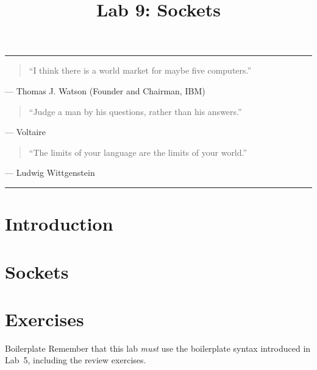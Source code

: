 \documentclass[11pt]{cselabheader}
\title{Lab 9: Sockets}
\begin{document}
\maketitle

\hrule
\begin{quotation}
``I think there is a world market for maybe five computers.''
\end{quotation}
\begin{flushright}
--- Thomas J. Watson (Founder and Chairman, IBM)
\end{flushright}

\begin{quotation}
``Judge a man by his questions, rather than his answers.''
\end{quotation}
\begin{flushright}
--- Voltaire
\end{flushright}

\begin{quotation}
``The limits of your language are the limits of your world.''
\end{quotation}
\begin{flushright}
--- Ludwig Wittgenstein
\end{flushright}

\hrule

\section{Introduction}

\pagebreak
\section{Sockets}
\label{sec:advfun}

\pagebreak

\section{Exercises}
\label{sec:ex}

\begin{warningbox}{Boilerplate}
  Remember that this lab \emph{must} use the
  boilerplate syntax introduced in Lab~5, including the review exercises.
\end{warningbox}
\end{document}
